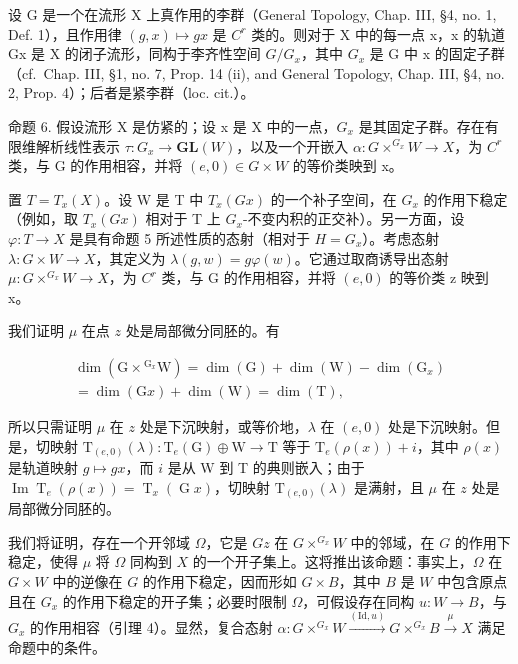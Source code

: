 设 G 是一个在流形 X 上真作用的李群（General Topology, Chap. III, §4, no. 1, Def. 1），且作用律 \((g, x) \mapsto gx\) 是 \(C^{r}\) 类的。则对于 X 中的每一点 x，x 的轨道 Gx 是 X 的闭子流形，同构于李齐性空间 \(G/G_{x}\)，其中 \(G_{x}\) 是 G 中 x 的固定子群（cf.~Chap. III, §1, no. 7, Prop. 14 (ii), and General Topology, Chap. III, §4, no. 2, Prop. 4）；后者是紧李群（loc. cit.）。

命题 6. 假设流形 X 是仿紧的；设 x 是 X 中的一点，\(G_{x}\) 是其固定子群。存在有限维解析线性表示 \(\tau: G_{x} \to \mathbf{GL}(W)\)，以及一个开嵌入 \(\alpha: G \times ^{G_{x}} W \to X\)，为 \(C^{r}\) 类，与 G 的作用相容，并将 \((e,0) \in G \times W\) 的等价类映到 x。

置 \(T = T_{x}(X)\)。设 W 是 T 中 \(T_{x}(Gx)\) 的一个补子空间，在 \(G_{x}\) 的作用下稳定（例如，取 \(T_{x}(Gx)\) 相对于 T 上 \(G_{x}\)-不变内积的正交补）。另一方面，设 \(\varphi : T \to X\) 是具有命题 5 所述性质的态射（相对于 \(H = G_{x}\)）。考虑态射 \(\lambda : G \times W \to X\)，其定义为 \(\lambda(g, w) = g\varphi(w)\)。它通过取商诱导出态射 \(\mu : G \times^{G_{x}}W \to X\)，为 \(C^{r}\) 类，与 G 的作用相容，并将 \((e, 0)\) 的等价类 z 映到 x。

我们证明 \(\mu\) 在点 \(z\) 处是局部微分同胚的。有

\[
\begin{array}{c} \dim (\mathrm{G} \times {} ^ {\mathrm{G} _ {x}} \mathrm{W}) = \dim (\mathrm{G}) + \dim (\mathrm{W}) - \dim (\mathrm{G} _ {x}) \\ = \dim (\mathrm{G} x) + \dim (\mathrm{W}) = \dim (\mathrm{T}), \end{array}
\]

所以只需证明 \(\mu\) 在 \(z\) 处是下沉映射，或等价地，\(\lambda\) 在 \((e,0)\) 处是下沉映射。但是，切映射 \(\mathrm{T}_{(e,0)}(\lambda):\mathrm{T}_e(\mathrm{G})\oplus \mathrm{W}\to \mathrm{T}\) 等于 \(\mathrm{T}_e(\rho (x)) + i\)，其中 \(\rho (x)\) 是轨道映射 \(g\mapsto gx\)，而 \(i\) 是从 W 到 T 的典则嵌入；由于 \(\operatorname {Im}\operatorname {T}_e(\rho (x)) = \operatorname {T}_x(\operatorname {G}x)\)，切映射 \(\mathrm{T}_{(e,0)}(\lambda)\) 是满射，且 \(\mu\) 在 \(z\) 处是局部微分同胚的。

我们将证明，存在一个开邻域 \(\Omega\)，它是 \(Gz\) 在 \(G \times ^{G_x}W\) 中的邻域，在 \(G\) 的作用下稳定，使得 \(\mu\) 将 \(\Omega\) 同构到 \(X\) 的一个开子集上。这将推出该命题：事实上，\(\Omega\) 在 \(G \times W\) 中的逆像在 \(G\) 的作用下稳定，因而形如 \(G \times B\)，其中 \(B\) 是 \(W\) 中包含原点且在 \(G_x\) 的作用下稳定的开子集；必要时限制 \(\Omega\)，可假设存在同构 \(u: W \to B\)，与 \(G_x\) 的作用相容（引理 4）。显然，复合态射 \(\alpha: G \times ^{G_x}W \xrightarrow{(\text{Id}, u)} G \times ^{G_x}B \xrightarrow{\mu} X\) 满足命题中的条件。

